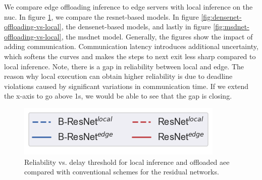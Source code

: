 We compare edge offloading inference to edge servers with local inference on the \gls{nuc}. In figure \ref{fig:resnet-offloading-vs-local}, we compare the \gls{resnet}-based models. In figure \ref{fig:densenet-offloading-vs-local}, the \gls{densenet}-based models, and lastly in figure \ref{fig:msdnet-offloading-vs-local}, the \gls{msdnet} model.
Generally, the figures show the impact of adding communication. Communication latency introduces additional uncertainty, which softens the curves and makes the steps to next exit less sharp compared to local inference. Note, there is a gap in reliability between local and edge. The reason why local execution can obtain higher reliability is due to deadline violations caused by significant variations in communication time. If we extend the x-axis to go above 1s, we would be able to see that the gap is closing. 
\begin{figure}
	\captionsetup[subfigure]{justification=centering, farskip=0pt,captionskip=0pt}
	\centering
	\includegraphics[width=.3\linewidth]{figures/edge/gpu_b-resnet_offloading_vs_local_legend}
	\hfill
	\hfill
	\caption[Offloading comparison of residual networks]{Reliability vs. delay threshold for local inference and offloaded \gls{aee} compared with conventional schemes for the residual networks.}
	\label{fig:resnet-offloading-vs-local}
\end{figure}

